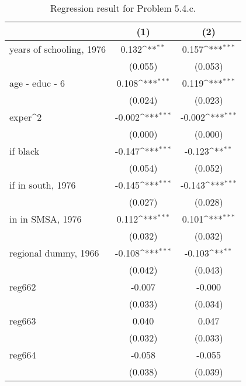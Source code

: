\begin{table}[htbp]\centering
\def\sym#1{\ifmmode^{#1}\else\(^{#1}\)\fi}
\caption{Regression result for Problem 5.4.c.}
\begin{tabular}{l*{2}{c}}
\toprule
                    &\multicolumn{1}{c}{(1)}         &\multicolumn{1}{c}{(2)}         \\
\midrule
years of schooling, 1976&       0.132\sym{**} &       0.157\sym{***}\\
                    &     (0.055)         &     (0.053)         \\
\addlinespace
age - educ - 6      &       0.108\sym{***}&       0.119\sym{***}\\
                    &     (0.024)         &     (0.023)         \\
\addlinespace
exper^2             &      -0.002\sym{***}&      -0.002\sym{***}\\
                    &     (0.000)         &     (0.000)         \\
\addlinespace
=1 if black         &      -0.147\sym{***}&      -0.123\sym{**} \\
                    &     (0.054)         &     (0.052)         \\
\addlinespace
=1 if in south, 1976&      -0.145\sym{***}&      -0.143\sym{***}\\
                    &     (0.027)         &     (0.028)         \\
\addlinespace
=1 in in SMSA, 1976 &       0.112\sym{***}&       0.101\sym{***}\\
                    &     (0.032)         &     (0.032)         \\
\addlinespace
regional dummy, 1966&      -0.108\sym{***}&      -0.103\sym{**} \\
                    &     (0.042)         &     (0.043)         \\
\addlinespace
reg662              &      -0.007         &      -0.000         \\
                    &     (0.033)         &     (0.034)         \\
\addlinespace
reg663              &       0.040         &       0.047         \\
                    &     (0.032)         &     (0.033)         \\
\addlinespace
reg664              &      -0.058         &      -0.055         \\
                    &     (0.038)         &     (0.039)         \\

\end{tabular}
\end{table}
